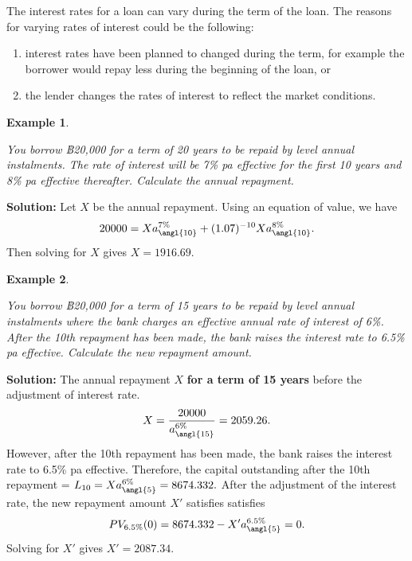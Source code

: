 \documentclass[
]{book}
\theoremstyle{definition}
\theoremstyle{definition}
\newtheorem{example}{Example}[chapter]
\theoremstyle{definition}
\theoremstyle{definition}
\theoremstyle{remark}
\begin{document}
The interest rates for a loan can vary during the term of the loan. The
reasons for varying rates of interest could be the following:

\begin{enumerate}
\def\labelenumi{\arabic{enumi}.}
\item
  interest rates have been planned to changed during the term, for
  example the borrower would repay less during the beginning of the
  loan, or
\item
  the lender changes the rates of interest to reflect the market
  conditions.
\end{enumerate}

\begin{example}
\protect\hypertarget{exm:unlabeled-div-51}{}\label{exm:unlabeled-div-51}

\emph{You borrow ฿20,000 for a term of 20 years to be repaid by level annual
instalments. The rate of interest will be 7\% pa effective for the first
10 years and 8\% pa effective thereafter. Calculate the annual
repayment.}

\end{example}

\textbf{Solution:} Let \(X\) be the annual repayment. Using an equation of
value, we have
\[20000 = X a^{7\%}_{\angl{10}} + (1.07)^{-10} X a^{8\%}_{\angl{10}}.\]
Then solving for \(X\) gives \(X = 1916.69\).

\begin{example}
\protect\hypertarget{exm:unlabeled-div-52}{}\label{exm:unlabeled-div-52}

\emph{You borrow ฿20,000 for a term of 15 years to be repaid by level annual
instalments where the bank charges an effective annual rate of interest
of 6\%. After the 10th repayment has been made, the bank raises the
interest rate to 6.5\% pa effective. Calculate the new repayment amount.}

\end{example}

\textbf{Solution:} The annual repayment \(X\) \textbf{for a term of 15 years} before
the adjustment of interest rate.
\[X = \frac{20000}{a^{6\%}_{\angl{15}}} = 2059.26.\] However, after the
10th repayment has been made, the bank raises the interest rate to 6.5\%
pa effective. Therefore, the capital outstanding after the 10th
repayment = \(L_{10} = X a^{6\%}_{\angl{5}} = 8674.332.\) After the
adjustment of the interest rate, the new repayment amount \(X'\) satisfies
satisfies \[PV_{6.5\%}(0) = 8674.332 - X' a^{6.5\%}_{\angl{5}} = 0.\]
Solving for \(X'\) gives \(X' = 2087.34\).
\end{document}
